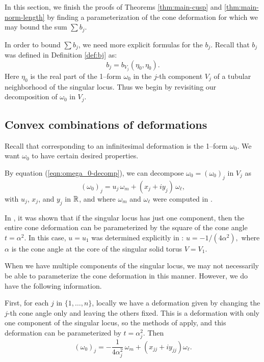 In this section, we finish the proofs of Theorems \ref{thm:main-cusp}
and \ref{thm:main-norm-length} by
finding a parameterization of the cone deformation for which we may
bound the sum $\sum b_j$.

In order to bound $\sum b_j$, we need more explicit formulas for the
$b_j$.  Recall that $b_j$ was defined in Definition \ref{def:bj} as:
$$b_j = b_{V_j}(\eta_0, \eta_0).$$
Here $\eta_0$ is the real part of the 1--form $\omega_0$ in the $j$-th
component $V_j$ of a tubular neighborhood of the singular locus.  Thus
we begin by revisiting our decomposition of $\omega_0$ in $V_j$.

	
\subsection{Convex combinations of deformations}
	\label{subsec:convex}

Recall that corresponding to an infinitesimal deformation is the
1--form $\omega_0$.  We want $\omega_0$ to have certain desired
properties.

By equation (\ref{eqn:omega_0-decomp}), we can decompose $\omega_0 =
(\omega_0)_j$ in $V_j$ as
$$(\omega_0)_j =u_j\, \omega_m + (x_j+iy_j)\,\omega_\ell,$$
with $u_j$, $x_j$, and $y_j$ in ${\mathbb{R}}$, and where $\omega_m$ and
$\omega_\ell$ were computed in \cite{hk:cone-rigid}.

In \cite{hk:univ}, it was shown that if the singular locus has just
one component, then the entire cone deformation can be parameterized
by the square of the cone angle $t=\alpha^2$.  In this case, $u=u_1$
was determined explicitly in \cite{hk:univ}: $u = -1/(4\alpha^2),$
where $\alpha$ is the cone angle at the core of the singular solid
torus $V=V_1$.

When we have multiple components of the singular locus, we may not
necessarily be able to parameterize the cone deformation in this
manner.  However, we do have the following information.

First, for each $j$ in $\{1, \dots, n\}$, locally we have a
deformation given by changing the $j$-th cone angle only and leaving
the others fixed.  This is a deformation with only one component of
the singular locus, so the methods of \cite{hk:univ} apply, and this
deformation can be parameterized by $t=\alpha_j^2$.  Then
\begin{equation*}
(\omega_0)_j = -\frac{1}{4\alpha_j^2}\, \omega_m +
(x_{jj}+iy_{jj})\omega_\ell.
\end{equation*}

